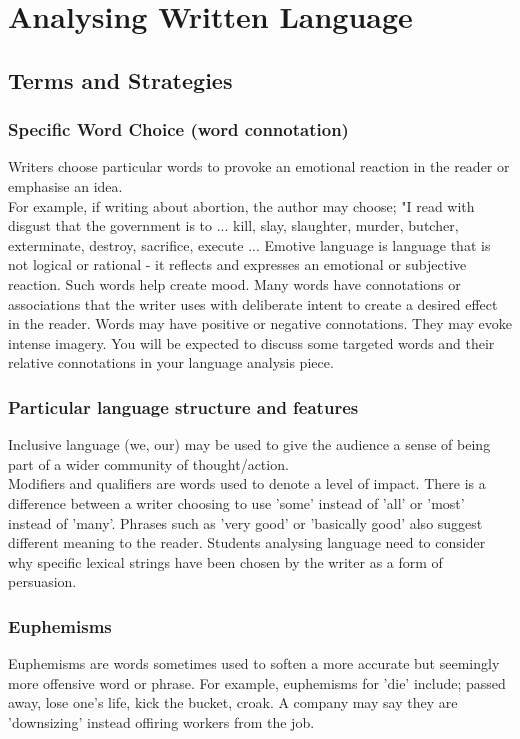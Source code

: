 \documentclass[a4paper]{article}
\begin{document}
\section{Analysing Written Language}
\subsection{Terms and Strategies}

\subsubsection{Specific Word Choice (word connotation) }
Writers choose particular words to provoke an emotional reaction in the reader or emphasise an idea.\\

For example, if writing about abortion, the author may choose;
"I read with disgust that the government is to ...
kill, slay, slaughter, murder, butcher, exterminate, destroy, sacrifice, execute ...
Emotive language is language that is not logical or rational - it reflects and expresses an emotional or subjective reaction. Such words help create mood. Many words have connotations or associations that the writer uses with deliberate intent to create a desired effect in the reader. Words may have positive or negative connotations. They may evoke intense imagery. You will be expected to discuss some targeted words and their relative connotations in your language analysis piece.\\


\subsubsection{Particular language structure and features}
Inclusive language (we, our) may be used to give the audience a sense of being part of a wider
community of thought/action.\\

Modifiers and qualifiers are words used to denote a level of impact. There is a difference
between a writer choosing to use 'some' instead of 'all' or 'most' instead of 'many'. Phrases
such as 'very good' or 'basically good' also suggest different meaning to the reader. Students
analysing language need to consider why specific lexical strings have been chosen by the writer
as a form of persuasion.\\

\subsubsection{Euphemisms}
Euphemisms are words sometimes used to soften a more accurate but seemingly more offensive
word or phrase. For example, euphemisms for 'die' include; passed away, lose one's life, kick
the bucket, croak. A company may say they are 'downsizing' instead offiring workers from the
job.
\end{document}

